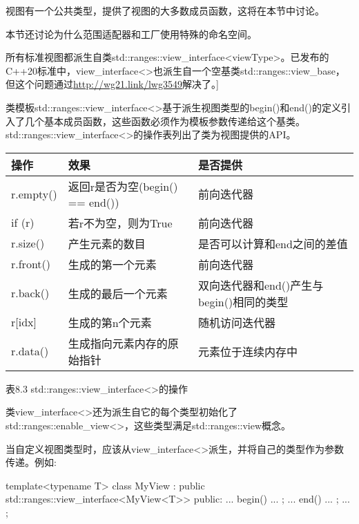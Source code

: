 
视图有一个公共类型，提供了视图的大多数成员函数，这将在本节中讨论。

本节还讨论为什么范围适配器和工厂使用特殊的命名空间。


所有标准视图都派生自类std::ranges::view\_interface<viewType>。已发布的C++20标准中，view\_interface<>也派生自一个空基类std::ranges::view\_base，但这个问题通过\url{http://wg21.link/lwg3549}解决了。]

类模板std::ranges::view\_interface<>基于派生视图类型的begin()和end()的定义引入了几个基本成员函数，这些函数必须作为模板参数传递给这个基类。std::ranges::view\_interface<>的操作表列出了类为视图提供的API。

\begin{longtable}[c]{|l|l|l|}
\hline
\textbf{操作} & \textbf{效果}                             & \textbf{是否提供}                       \\ \hline
\endfirsthead
%
\endhead
%
r.empty()          & 返回r是否为空(begin() == end()) & 前向迭代器                 \\ \hline
if (r)             & 若r不为空，则为True                      & 前向迭代器                 \\ \hline
r.size()           & 产生元素的数目               & 是否可以计算和end之间的差值 \\ \hline
r.front()          & 生成的第一个元素                    & 前向迭代器                 \\ \hline
r.back() & 生成的最后一个元素                            & 双向迭代器和end()产生与begin()相同的类型 \\ \hline
r{[}idx{]}         & 生成的第n个元素                     & 随机访问迭代器           \\ \hline
r.data() & 生成指向元素内存的原始指针 & 元素位于连续内存中                                          \\ \hline
\end{longtable}

\begin{center}
表8.3 std::ranges::view\_interface<>的操作
\end{center}

类view\_interface<>还为派生自它的每个类型初始化了std::ranges::enable\_view<>，这些类型满足std::ranges::view概念。

当自定义视图类型时，应该从view\_interface<>派生，并将自己的类型作为参数传递。例如:

\begin{cpp}
template<typename T>
class MyView : public std::ranges::view_interface<MyView<T>> {
	public:
	... begin() ... ;
	... end() ... ;
	...
};
\end{cpp}

